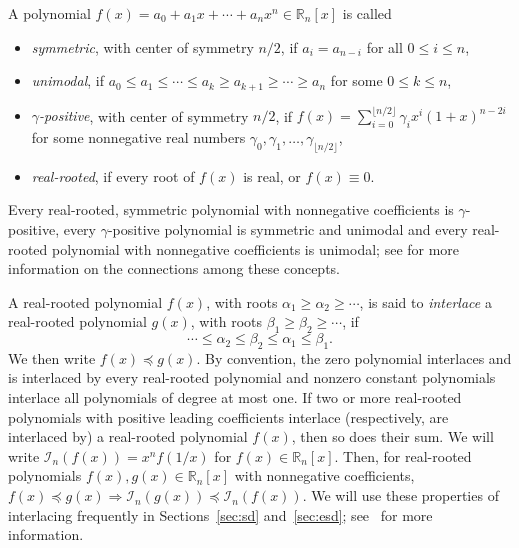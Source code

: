\documentclass[11pt]{amsart}
\newcommand{\iI}{{\mathcal I}}
\newcommand{\RR}{{\mathbb R}}
\begin{document}
A polynomial $f(x) = a_0 + a_1 x + \cdots + a_n x^n 
\in \RR_n[x]$ is called
%
\begin{itemize}
\item[$\bullet$] 
  \emph{symmetric}, with center of symmetry $n/2$, 
	if $a_i = a_{n-i}$ for all $0 \le i \le n$,
\item[$\bullet$] 
  \emph{unimodal}, if $a_0 \le a_1 \le \cdots \le 
	              a_k \ge a_{k+1} \ge \cdots \ge a_n$ 
	for some $0 \le k \le n$,
\item[$\bullet$] 
  \emph{$\gamma$-positive}, with center of symmetry 
	$n/2$, if $f(x) = \sum_{i=0}^{\lfloor n/2 \rfloor} 
	\gamma_i x^i (1+x)^{n-2i}$ for some nonnegative real 
	numbers $\gamma_0, \gamma_1,\dots,\gamma_{\lfloor n/2 
	\rfloor}$,
\item[$\bullet$] 
  \emph{real-rooted}, if every root of $f(x)$ is real, 
	or $f(x) \equiv 0$.
\end{itemize}
%
Every real-rooted, symmetric polynomial with 
nonnegative coefficients is $\gamma$-positive, every 
$\gamma$-positive polynomial is symmetric and unimodal
and every real-rooted polynomial with nonnegative 
coefficients is unimodal; see \cite{Bra15, Ga05} for 
more information on the connections among these 
concepts.

A real-rooted polynomial $f(x)$, with roots 
$\alpha_1 \ge \alpha_2 \ge \cdots$, is said to 
\emph{interlace} a real-rooted polynomial $g(x)$, with 
roots $\beta_1 \ge \beta_2 \ge \cdots$, if
%
\[ \cdots \le \alpha_2 \le \beta_2 \le \alpha_1 \le
   \beta_1. \]
% 
We then write $f(x) \preceq g(x)$. By convention, 
the zero polynomial interlaces and is interlaced by 
every real-rooted polynomial and nonzero constant 
polynomials interlace all polynomials of 
degree at most one. If two or more real-rooted 
polynomials with positive leading coefficients 
interlace (respectively, are interlaced by) a 
real-rooted polynomial $f(x)$, then so does their 
sum. We will write $\iI_n(f(x)) = x^n f(1/x)$ for 
$f(x) \in \RR_n[x]$. Then, for real-rooted 
polynomials $f(x), g(x) \in \RR_n[x]$ with 
nonnegative coefficients, $f(x) \preceq g(x) 
\Rightarrow \iI_n(g(x)) \preceq \iI_n(f(x))$. We 
will use these properties of interlacing 
frequently in Sections~\ref{sec:sd} 
and~\ref{sec:esd}; see~\cite[Section~7.8]{Bra15} 
for more information.  
\end{document}
